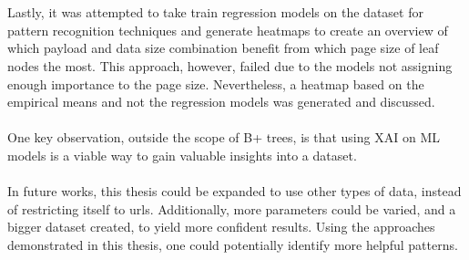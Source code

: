 \\\\
Lastly, it was attempted to take train regression models on the dataset for pattern recognition techniques and generate heatmaps to create an overview of which payload and data size combination benefit from which page size of leaf nodes the most. This approach, however, failed due to the models not assigning enough importance to the page size. Nevertheless, a heatmap based on the empirical means and not the regression models was generated and discussed.
\\\\
One key observation, outside the scope of B+ trees, is that using \ac{XAI} on \ac{ML} models is a viable way to gain valuable insights into a dataset.
\\\\
In future works, this thesis could be expanded to use other types of data, instead of restricting itself to urls. Additionally, more parameters could be varied, and a bigger dataset created, to yield more confident results. Using the approaches demonstrated in this thesis, one could potentially identify more helpful patterns.
